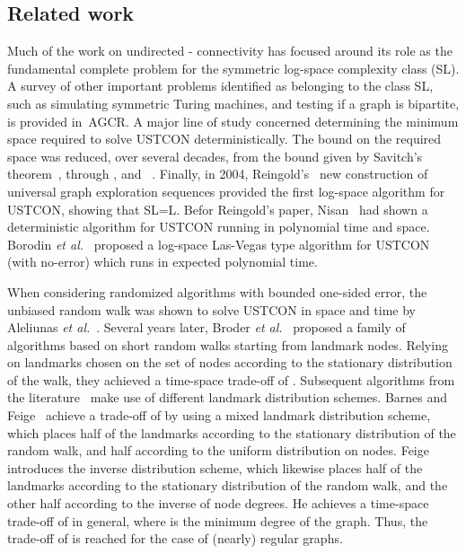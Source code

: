 \documentclass[11pt,a4paper]{article}
\newcommand{\Broder}{Broder \etal}
\newcommand{\etal}{\textsl{et al.}\xspace}
\renewcommand{\*}{\hspace*{5mm}}
\begin{document}
\subsection{Related work}

Much of the work on undirected - connectivity has focused around its role as the fundamental complete problem for the symmetric log-space complexity class (SL). A survey of other important problems identified as belonging to the class SL, such as simulating symmetric Turing machines, and testing if a graph is bipartite, is provided in~{AGCR}. A major line of study concerned determining the minimum space required to solve USTCON deterministically. The bound on the required space was reduced, over several decades, from the  bound given by Savitch's theorem~\cite{Sav}, through  \cite{SZ}, and ~\cite{ATWZ}. Finally, in 2004, Reingold's~\cite{Rei} new construction of universal graph exploration sequences provided the first log-space algorithm for USTCON, showing that SL=L. Befor Reingold's paper, Nisan~\cite{Nis} had shown a deterministic algorithm for USTCON running in polynomial time and  space. Borodin \etal~\cite{BCDRT} proposed a log-space Las-Vegas type algorithm for USTCON (with no-error) which runs in expected polynomial time.

When considering randomized algorithms with bounded one-sided error, the unbiased random walk was shown to solve USTCON in  space and  time by Aleliunas \etal~\cite{AKLLR}. Several years later, \Broder~\cite{BKRU} proposed a family of algorithms based on short random walks starting from landmark nodes. Relying on landmarks chosen on the set of nodes according to the stationary distribution of the walk, they achieved a time-space trade-off of . Subsequent algorithms from the literature~\cite{BF,F} make use of different landmark distribution schemes. Barnes and Feige~\cite{BF} achieve a trade-off of  by using a mixed landmark distribution scheme, which places half of the landmarks according to the stationary distribution of the random walk, and half according to the uniform distribution on nodes. Feige~\cite{F} introduces the inverse distribution scheme, which likewise places half of the landmarks according to the stationary distribution of the random walk, and the other half according to the inverse of node degrees. He achieves a time-space trade-off of  in general, where  is the minimum degree of the graph. Thus, the trade-off of  is reached for the case of (nearly) regular graphs.
\end{document}
